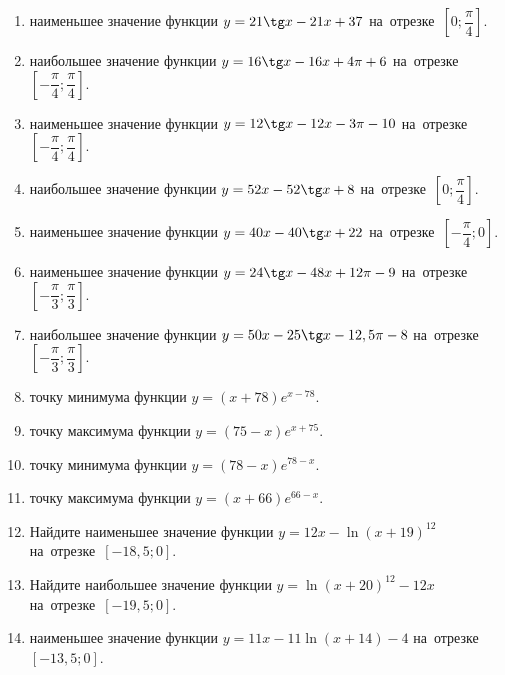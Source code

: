 \documentclass[a4paper,10pt]{article}
\begin{document}
\begin{enumerate}
\item {} наименьшее значение функции $y = 21\tg x-21x+37$ на~отрезке~$\left[0;\dfrac{\pi }{4}\right]$.

\item {} наибольшее значение функции $y=16\tg x-16x+4\pi +6$ на~отрезке~$\left[-\dfrac{\pi }{4};\dfrac{\pi }{4}\right]$.

\item {} наименьшее значение функции $y=12\tg x-12x-3\pi -10$ на~отрезке~$\left[-\dfrac{\pi }{4};\dfrac{\pi }{4}\right]$.

\item {} наибольшее значение функции $y = 52x-52\tg x +8$ на~отрезке~$\left[0;\dfrac{\pi }{4}\right]$.

\item {} наименьшее значение функции $y = 40x-40\tg x +22$ на~отрезке~$\left[-\dfrac{\pi }{4};0\right]$.

\item {} наименьшее значение функции $y = 24\tg x-48x+12 \pi -9$ на~отрезке~$\left[-\dfrac{\pi }{3};\dfrac{\pi }{3}\right]$.

\item {} наибольшее значение функции $y = 50x-25\tg x-12,5\pi -8$ на~отрезке~$\left[-\dfrac{\pi }{3};\dfrac{\pi }{3}\right]$.

\item {} точку минимума функции $y = \left(x+78\right)e^{x-78}$.

\item {} точку максимума функции $y = \left(75-x\right)e^{x+75}$.

\item {} точку минимума функции $y = \left(78-x\right)e^{78-x}$.

\item {} точку максимума функции $y = \left(x+66\right)e^{66-x}$.

\item Найдите наименьшее значение функции $y = 12x-\ln \left(x+19\right)^{12}$ на~отрезке~$\left[-18,5;0\right]$.

\item Найдите наибольшее значение функции $y = \ln \left(x+20\right)^{12}-12x$ на~отрезке~$\left[-19,5;0\right]$.

\item {} наименьшее значение функции $y = 11x-11\ln \left(x+14\right) -4$ на~отрезке~$\left[-13,5;0\right]$.


\end{enumerate}
\end{document}
